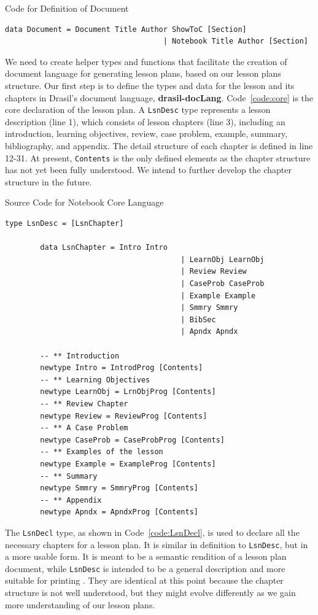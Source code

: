 \begin{listing}[h]
	\caption{Code for Definition of Document}
	\label{code:drasil-lang-document}
	\begin{lstlisting}[language=haskell1]
		data Document = Document Title Author ShowToC [Section]
									| Notebook Title Author [Section]
	\end{lstlisting}
\end{listing}

We need to create helper types and functions that facilitate the creation of 
document language for generating lesson plans, based on our lesson plans 
structure. Our first step is to define the types and data for the lesson and 
its chapters in Drasil's document language, \textbf{drasil-docLang}. 
Code~\ref{code:core} is the core declaration of the lesson plan. A 
\texttt{LsnDesc} type represents a lesson description (line 1), which consists 
of lesson chapters (line 3), including an introduction, learning objectives, 
review, case problem, example, summary, bibliography, and appendix. The detail 
structure of each chapter is defined in line 12-31. At present, 
\texttt{Contents} is the only defined elements as the chapter structure has not 
yet been fully understood. We intend to further develop the chapter structure 
in the future.

\begin{listing}[h!]
	\caption{Source Code for Notebook Core Language}
	\label{code:core}
	\begin{lstlisting}[language=haskell1]		
		type LsnDesc = [LsnChapter]

		data LsnChapter = Intro Intro
										| LearnObj LearnObj
										| Review Review
										| CaseProb CaseProb
										| Example Example
										| Smmry Smmry
										| BibSec
										| Apndx Apndx
		
		-- ** Introduction
		newtype Intro = IntrodProg [Contents]		
		-- ** Learning Objectives
		newtype LearnObj = LrnObjProg [Contents]		
		-- ** Review Chapter
		newtype Review = ReviewProg [Contents]		
		-- ** A Case Problem
		newtype CaseProb = CaseProbProg [Contents]		
		-- ** Examples of the lesson
		newtype Example = ExampleProg [Contents]		
		-- ** Summary
		newtype Smmry = SmmryProg [Contents]		
		-- ** Appendix
		newtype Apndx = ApndxProg [Contents]
	\end{lstlisting}
\end{listing}

The \texttt{LsnDecl} type, as shown in Code~\ref{code:LsnDecl}, is used to 
declare all the necessary chapters for a lesson plan. It is similar in 
definition to \texttt{LsnDesc}, but in a more usable form. It is meant to be a 
semantic rendition of a lesson plan document, while \texttt{LsnDesc} is 
intended to be a general description and more suitable for printing 
\cite{lsnDeclandlsnDesc}. They are identical at this point because the chapter 
structure is not well understood, but they might evolve differently as we gain 
more understanding of our lesson plans.

